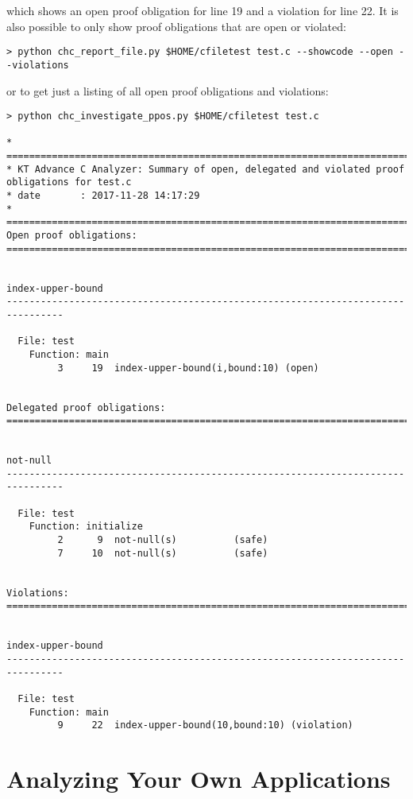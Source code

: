 \documentclass[11pt]{article}
\begin{document}
which shows an open proof obligation for line 19 and a violation for line 22. It is also
possible to only show proof obligations that are open or violated:
\begin{verbatim}
> python chc_report_file.py $HOME/cfiletest test.c --showcode --open --violations
\end{verbatim}
or to get just a listing of all open proof obligations and violations:
\begin{scriptsize}
\begin{verbatim}
> python chc_investigate_ppos.py $HOME/cfiletest test.c 

* ================================================================================
* KT Advance C Analyzer: Summary of open, delegated and violated proof obligations for test.c
* date       : 2017-11-28 14:17:29
* ================================================================================
Open proof obligations:
================================================================================


index-upper-bound
--------------------------------------------------------------------------------

  File: test
    Function: main
         3     19  index-upper-bound(i,bound:10) (open)


Delegated proof obligations:
================================================================================


not-null
--------------------------------------------------------------------------------

  File: test
    Function: initialize
         2      9  not-null(s)          (safe)
         7     10  not-null(s)          (safe)


Violations:
================================================================================


index-upper-bound
--------------------------------------------------------------------------------

  File: test
    Function: main
         9     22  index-upper-bound(10,bound:10) (violation)
\end{verbatim}
\end{scriptsize}

\section{Analyzing Your Own Applications}
\label{sec:mfapp}



\end{document}
